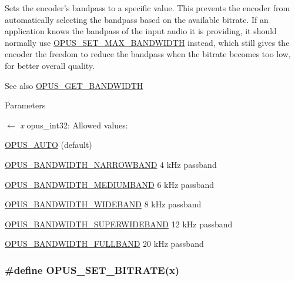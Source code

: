 Sets the encoder's bandpass to a specific value. This prevents the encoder from automatically selecting the bandpass based on the available bitrate. If an application knows the bandpass of the input audio it is providing, it should normally use \hyperlink{group__opus__encoderctls_ga4f88288e89c595c07c61db316cc45289}{OPUS\_\-SET\_\-MAX\_\-BANDWIDTH} instead, which still gives the encoder the freedom to reduce the bandpass when the bitrate becomes too low, for better overall quality. \begin{DoxySeeAlso}{See also}
\hyperlink{group__opus__genericctls_ga29db1d9b5e670debec54d1163ad2ec62}{OPUS\_\-GET\_\-BANDWIDTH} 
\end{DoxySeeAlso}

\begin{DoxyParams}{Parameters}
\item[\mbox{$\leftarrow$} {\em x}]{\ttfamily opus\_\-int32}: Allowed values: 
\begin{DoxyDescription}
\item[\hyperlink{group__opus__ctlvalues_ga1c5b3244b018ff4548d2d6bffa418472}{OPUS\_\-AUTO} ](default) 
\item[\hyperlink{group__opus__ctlvalues_ga607dd310958b9c7d545d005e4572d47f}{OPUS\_\-BANDWIDTH\_\-NARROWBAND} ]4 kHz passband 
\item[\hyperlink{group__opus__ctlvalues_ga53a2aff4dc0ee23682927ca568c422a3}{OPUS\_\-BANDWIDTH\_\-MEDIUMBAND} ]6 kHz passband 
\item[\hyperlink{group__opus__ctlvalues_gac698e5d1281a3632251d2a4ead48afb9}{OPUS\_\-BANDWIDTH\_\-WIDEBAND} ]8 kHz passband 
\item[\hyperlink{group__opus__ctlvalues_ga41f86df35af0033a7361895da88671c1}{OPUS\_\-BANDWIDTH\_\-SUPERWIDEBAND}]12 kHz passband 
\item[\hyperlink{group__opus__ctlvalues_ga74cb052d8ec36cbcc9708c417558ebdd}{OPUS\_\-BANDWIDTH\_\-FULLBAND} ]20 kHz passband 
\end{DoxyDescription}\end{DoxyParams}
\hypertarget{group__opus__encoderctls_ga0bb51947e355b33d0cb358463b5101a7}{
\subsubsection[{OPUS\_\-SET\_\-BITRATE}]{\setlength{\rightskip}{0pt plus 5cm}\#define OPUS\_\-SET\_\-BITRATE(x)}}
\label{group__opus__encoderctls_ga0bb51947e355b33d0cb358463b5101a7}


